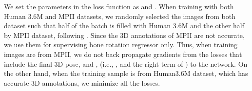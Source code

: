 We set the parameters in the loss function as  and . When training with both Human 3.6M and MPII datasets, we randomly selected the images from both dataset such that half of the batch is filled with Human 3.6M and the other half by MPII dataset, following \cite{zhou2017weakly}. Since the 3D annotations of MPII are not accurate, we use them for supervising bone rotation regressor only. Thus, when training images are from MPII, we do not back propagate gradients from the losses that include the final 3D pose,   and , (i.e., ,  and the right term of ) to the network. On the other hand, when the training sample is from Human3.6M dataset, which has accurate 3D annotations, we minimize all the losses.


 
\begin{comment}
\begin{table}[hbt]
	\begin{center}
		\caption{Results on Human 3.6M dataset. Only Human 3.6M dataset is used in training. MPJPE [mm] is used for error metric.}
		\label{tab:comparison2}
		\scalebox{0.8}{
			\begin{tabular}{c c c c c c c c c}
				\hline                & Directions  & Discussion  & Eating      & Greeting    & Phoning & Posing & Purchases & Sitting      \\  
				\hline Ours (Rot reg only) & 93.363       & 123.65       & 106.23      & 112.77      & 107.8  & 117.01        & 100.16    & 109.77   \\  
				Ours (Heatmap only)   & 110.39	    & 139.43      & 97.369      & 123.94      & 115.50  & 141.85  & 117.73   & 150.85   \\  
				Ours (Rot reg + HM)    & {\bf 80.59} & {\bf 89.89} & {\bf 74.64} & {\bf 83.96} & {\bf 78.87}   & 102.04  & {\bf 76.94}    & {\bf 81.53}   \\  
				Ours (All)  & 63.33  & 71.59  & 61.39 & 70.40 & 69.90 &  83.17 & 62.98  & 68.77    \\  
				\hline   & SittingDown   & Smoking     & Photo       & Waiting     & WalkDog    & Walking     & WalkPair    & Average \\ 
				\hline Ours (Rot reg only) & 144.27        & 174.95     & 107.13      & 99.808       & 119.94    & 97.891       &  71.699     & 112.43  \\  
				Ours (Heatmap only)   & 131.60        & 187.74      & 115.70      & 121.84      & 144.03     & 122.24      & 107.96      & 128.55 \\  
				Ours (Rot reg + HM)    & {\bf 100.30}  & 132.74      & {\bf 82.24} & {\bf 80.27} & 96.23      & {\bf 77.30} & {\bf 68.20} & {\bf 87.05} \\ 
				Ours (All)  & 76.81 & 98.90 & 68.24 & 67.45 & 73.74 & 57.72 & 57.13 & 69.95  \\  
				\hline 
			\end{tabular}
		}
	\end{center}
\vspace{-10pt}
\end{table}
\end{comment}







